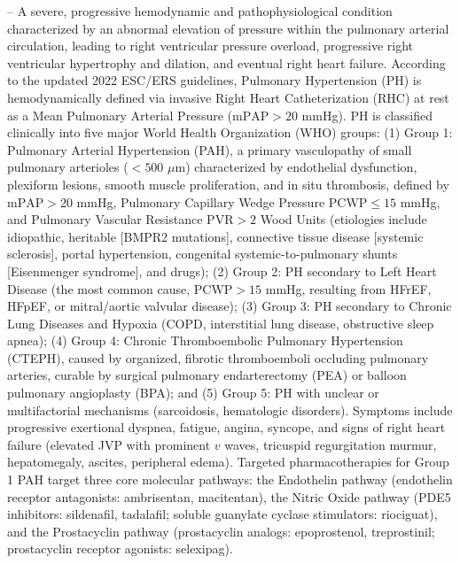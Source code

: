 -- A severe, progressive hemodynamic and pathophysiological condition characterized by an abnormal elevation of pressure within the pulmonary arterial circulation, leading to right ventricular pressure overload, progressive right ventricular hypertrophy and dilation, and eventual right heart failure. According to the updated 2022 ESC/ERS guidelines, Pulmonary Hypertension (PH) is hemodynamically defined via invasive Right Heart Catheterization (RHC) at rest as a Mean Pulmonary Arterial Pressure ($\text{mPAP} > 20$ mmHg). PH is classified clinically into five major World Health Organization (WHO) groups: (1) Group 1: Pulmonary Arterial Hypertension (PAH), a primary vasculopathy of small pulmonary arterioles ($<500$ $\mu$m) characterized by endothelial dysfunction, plexiform lesions, smooth muscle proliferation, and in situ thrombosis, defined by $\text{mPAP} > 20$ mmHg, Pulmonary Capillary Wedge Pressure $\text{PCWP} \le 15$ mmHg, and Pulmonary Vascular Resistance $\text{PVR} > 2$ Wood Units (etiologies include idiopathic, heritable [BMPR2 mutations], connective tissue disease [systemic sclerosis], portal hypertension, congenital systemic-to-pulmonary shunts [Eisenmenger syndrome], and drugs); (2) Group 2: PH secondary to Left Heart Disease (the most common cause, $\text{PCWP} > 15$ mmHg, resulting from HFrEF, HFpEF, or mitral/aortic valvular disease); (3) Group 3: PH secondary to Chronic Lung Diseases and Hypoxia (COPD, interstitial lung disease, obstructive sleep apnea); (4) Group 4: Chronic Thromboembolic Pulmonary Hypertension (CTEPH), caused by organized, fibrotic thromboemboli occluding pulmonary arteries, curable by surgical pulmonary endarterectomy (PEA) or balloon pulmonary angioplasty (BPA); and (5) Group 5: PH with unclear or multifactorial mechanisms (sarcoidosis, hematologic disorders). Symptoms include progressive exertional dyspnea, fatigue, angina, syncope, and signs of right heart failure (elevated JVP with prominent $v$ waves, tricuspid regurgitation murmur, hepatomegaly, ascites, peripheral edema). Targeted pharmacotherapies for Group 1 PAH target three core molecular pathways: the Endothelin pathway (endothelin receptor antagonists: ambrisentan, macitentan), the Nitric Oxide pathway (PDE5 inhibitors: sildenafil, tadalafil; soluble guanylate cyclase stimulators: riociguat), and the Prostacyclin pathway (prostacyclin analogs: epoprostenol, treprostinil; prostacyclin receptor agonists: selexipag).

